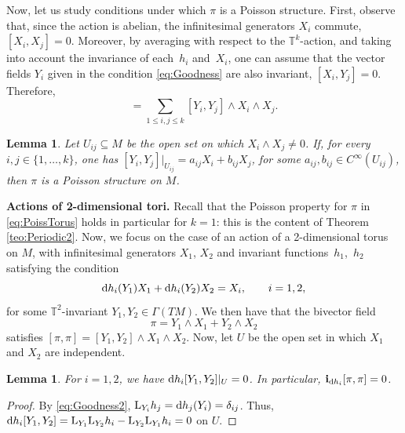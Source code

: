 \documentclass[10pt,a4paper]{amsart}
\newcommand{\dd}{{\rm d}}
\newcommand{\ii}{\mathbf{i}}
\numberwithin{equation}{section}
\newtheorem{Lemma}[Theorem]{Lemma}
\begin{document}
Now, let us study conditions under which $\pi$ is a Poisson structure. First, observe that, since the action is abelian, the infinitesimal generators $X_{i}$ commute, $[X_{i},X_{j}] = 0$. Moreover, by averaging with respect to the $\mathbb{T}^{k}$-action, and taking into account the invariance of each~$h_i$ and~$X_i$, one can assume that the vector fields $Y_{i}$ given in the condition \eqref{eq:Goodness} are also invariant, $[X_{i},Y_{j}] = 0$. Therefore,
 \begin{equation*}
 [\pi,\pi] = \sum_{1 \leq i,j \leq k}[Y_i,Y_{j}]\wedge X_{i}\wedge X_{j}.
 \end{equation*}

\begin{Lemma}\label{lemma:PoissToric1}
Let $U_{ij} \subseteq M$ be the open set on which $X_{i} \wedge X_{j} \neq 0$. If, for every $i,j \in \{1,\dots,k\}$, one has $[Y_{i},Y_{j}]|_{U_{ij}} = a_{ij}X_{i} + b_{ij}X_{j}$, for some $a_{ij},b_{ij} \in C^{\infty}(U_{ij})$, then $\pi$ is a Poisson structure on $M$.
\end{Lemma}

{\bf Actions of 2-dimensional tori.} Recall that the Poisson property for $\pi$ in \eqref{eq:PoissTorus} holds in particular for $k=1$: this is the content of Theorem \ref{teo:Periodic2}. Now, we focus on the case of an action of a 2-dimensional torus on $M$, with infinitesimal generators $X_1$, $X_2$ and invariant functi\-ons~$h_1$,~$h_2$ satisfying the condition
 \begin{equation}\label{eq:Goodness2}
 \dd h_{i}(Y_{1})X_{1} + \dd h_{i}(Y_{2})X_{2} = X_{i}, \qquad i = 1, 2,
 \end{equation}
for some $\mathbb{T}^2$-invariant $Y_1,Y_2 \in \Gamma(TM)$. We then have that the bivector field
 \begin{equation}\label{eq:PoissTorus2}
 \pi = Y_1\wedge X_1 + Y_2\wedge X_2
 \end{equation}
satisfies $[\pi,\pi] = [Y_1,Y_2] \wedge X_1 \wedge X_2$.
Now, let $U$ be the open set in which $X_{1}$ and $X_{2}$ are independent.

\begin{Lemma}\label{lemma:PoissToric2}
For $i = 1,2$, we have $\dd h_{i}[Y_{1},Y_{2}]|_{U} = 0$. In particular, $\ii_{\dd h_{i}}[\pi,\pi] = 0$.
\end{Lemma}
\begin{proof}
By \eqref{eq:Goodness2}, ${\rm L}_{Y_{i}}h_{j} = \dd h_{j}(Y_{i}) = \delta_{ij}$. Thus, $\dd h_{i}[Y_{1},Y_{2}] = {\rm L}_{Y_{1}}{\rm L}_{Y_{2}}h_{i} - {\rm L}_{Y_{2}}{\rm L}_{Y_{1}}h_{i} = 0$ on $U$.
\end{proof}
\end{document}
